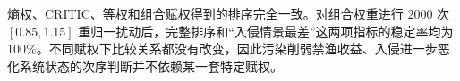 熵权、CRITIC、等权和组合赋权得到的排序完全一致。对组合权重进行 2000 次 $[0.85,1.15]$ 重归一扰动后，完整排序和“入侵情景最差”这两项指标的稳定率均为 100\%。不同赋权下比较关系都没有改变，因此污染削弱禁渔收益、入侵进一步恶化系统状态的次序判断并不依赖某一套特定赋权。
